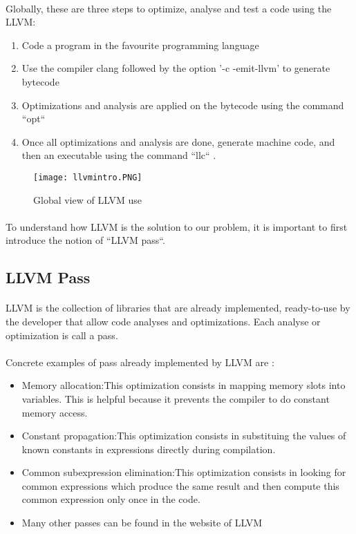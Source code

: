 \documentclass{article}
\begin{document}
\begin{itemize}
\paragraph{}
Globally, these are three steps to optimize, analyse and test a code using the LLVM: 
\begin{enumerate}
\item Code a program in the favourite programming language 
\item Use the compiler clang followed by the option '-c -emit-llvm' to generate bytecode
\item Optimizations and analysis are applied on the bytecode using the command ``opt``
\item Once all optimizations and analysis are done, generate machine code, and then an executable using the command ``llc`` \cite{LattnerAdve:tutorial}.
\end{enumerate}

\begin{figure}[h]
	\centering
	\texttt{[image: llvmintro.PNG]}
	\caption{Global view of LLVM use}
	\label{fig:llvmUse}
\end{figure}

\paragraph{}
To understand how LLVM is the solution to our problem, it is important to first introduce the notion of ``LLVM pass``.

\subsection{LLVM Pass}

\paragraph{}
LLVM is the collection of libraries that are already implemented, ready-to-use by the developer that allow code analyses and optimizations. Each analyse or optimization is call a pass. 

\paragraph{}
Concrete examples of pass already implemented by LLVM are :
\begin{itemize}
\item Memory allocation:This optimization consists in mapping memory slots into variables. This is helpful because it prevents the compiler to do constant memory access.
\item Constant propagation:This optimization consists in substituing the values of known constants in expressions directly during compilation.
\item Common subexpression elimination:This optimization consists in looking for common expressions which produce the same result and then compute this common expression only once in the code.
\item Many other passes can be found in the website of LLVM \cite{bworld}
\end{itemize}


\end{itemize}
\end{document}
